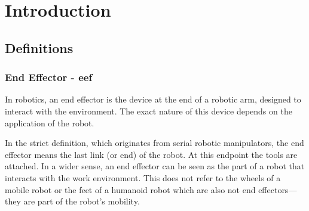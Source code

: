 
\usepackage{amsmath}
\usepackage{amssymb} %
\usepackage{algorithm}
\usepackage{algpseudocode}
\usepackage{bm}
\usepackage{subcaption} %
\usepackage{algpseudocode}
\usepackage{pifont}
\usepackage{graphicx} %
\usepackage{epstopdf} %
\usepackage{listings}
\usepackage{xcolor}
\graphicspath{ {fig/} } %
\newcommand{\inr}[1]{\in \mathbb{R}^#1}

\usepackage{amsthm} %
\newtheorem{definition}{Definition}[section]
\newtheorem*{remark}{Remark}
\newpage


\pagestyle{empty} %
\titleGM %
\tableofcontents
\newpage
\section{Introduction}
\subsection{Definitions}
\subsubsection*{End Effector - eef}
In robotics, an end effector is the device at the end of a robotic arm, designed to interact with the environment. The exact nature of this device depends on the application of the robot.\par In the strict definition, which originates from serial robotic manipulators, the end effector means the last link (or end) of the robot. At this endpoint the tools are attached. In a wider sense, an end effector can be seen as the part of a robot that interacts with the work environment. This does not refer to the wheels of a mobile robot or the feet of a humanoid robot which are also not end effectors—they are part of the robot's mobility.
